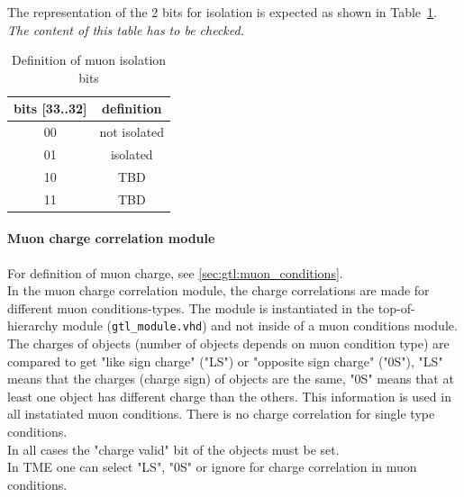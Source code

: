 The representation of the 2 bits for isolation is expected as shown in Table~\ref{tab:gtl:muon_iso_bits}.\\
\textit{The content of this table has to be checked.}
 
\begin{table}[ht]
\caption{Definition of muon isolation bits}
\vspace{5mm}
\centering
\begin{tabular}{|c|c|}\hline
bits [33..32] & definition \\\hline\hline
00 & not isolated \\
01 & isolated \\
10 & TBD \\
11 & TBD \\\hline
\end{tabular}
\label{tab:gtl:muon_iso_bits}
\end{table}

\clearpage

\paragraph{Muon charge correlation module}\label{sec:gtl:muon_charge_correlation_module}

For definition of muon charge, see \ref{sec:gtl:muon_conditions}.\\
In the muon charge correlation module, the charge correlations are made for different muon conditions-types. The module is instantiated in the top-of-hierarchy module (\texttt{gtl\_module.vhd})
and not inside of a muon conditions module. 
The charges of objects (number of objects depends on muon condition type) are compared to get "like sign charge" ("LS") or "opposite sign charge" ("0S"), "LS" means that the charges (charge sign)
of objects are the same, "0S" means that at least one object has different charge than the others. This information is used in all instatiated muon conditions.
There is no charge correlation for single type conditions.\\
In all cases the "charge valid" bit of the objects must be set.\\
In TME one can select "LS", "0S" or ignore for charge correlation in muon conditions.\\

